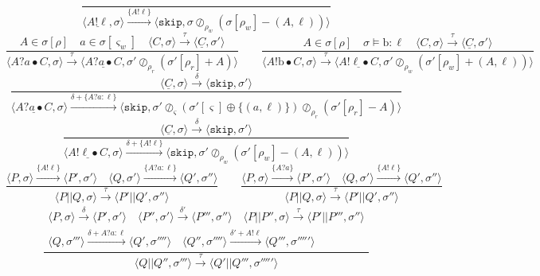 \documentclass[times,10pt]{article}
\begin{document}
$$    \frac{}{\langle \underline{A!\ell}, \sigma \rangle \xrightarrow{\{A!\ell\}} \langle \mathtt{skip}, \sigma \oslash_{\rho_w} (\sigma[\rho_w] - (A, \ell)) \rangle} $$$$
    \frac{A \in \sigma[\rho] \quad a \in \sigma[\varsigma_w] \quad \langle C, \sigma \rangle \xrightarrow{\tau} \langle \underline{C}, \sigma' \rangle}{\langle A?a \bullet C, \sigma \rangle \xrightarrow{\tau} \langle \underline{A?a \bullet C}, \sigma' \oslash_{\rho_r} (\sigma'[\rho_r] + A) \rangle} \qquad
    \frac{A \in \sigma[\rho] \quad \sigma \models \mathrm{b} : \ell \quad \langle C, \sigma \rangle \xrightarrow{\tau} \langle \underline{C}, \sigma' \rangle}{\langle A!\mathrm{b} \bullet C, \sigma \rangle \xrightarrow{\tau} \langle \underline{A!\ell \bullet C}, \sigma' \oslash_{\rho_w} (\sigma'[\rho_w] + (A, \ell)) \rangle} $$$$
    \frac{\langle \underline{C}, \sigma \rangle \xrightarrow{\delta} \langle \mathtt{skip}, \sigma' \rangle}{\langle \underline{A?a \bullet C}, \sigma \rangle \xrightarrow{\delta + \{A?a : \ell\}} \langle \mathtt{skip}, \sigma' \oslash_\varsigma (\sigma'[\varsigma] \oplus \{(a, \ell)\}) \oslash_{\rho_r} (\sigma'[\rho_r] - A) \rangle} $$$$
    \frac{\langle \underline{C}, \sigma \rangle \xrightarrow{\delta} \langle \mathtt{skip}, \sigma' \rangle}{\langle \underline{A!\ell \bullet C}, \sigma \rangle \xrightarrow{\delta + \{A!\ell\}} \langle \mathtt{skip}, \sigma' \oslash_{\rho_w} (\sigma'[\rho_w] - (A, \ell)) \rangle} $$$$
    \frac{\langle P, \sigma \rangle \xrightarrow{\{A!\ell\}} \langle P', \sigma' \rangle \quad \langle Q, \sigma' \rangle \xrightarrow{\{A?a : \ell\}} \langle Q', \sigma'' \rangle}{\langle P || Q, \sigma \rangle \xrightarrow{\tau} \langle P' || Q', \sigma'' \rangle} \qquad
    \frac{\langle P, \sigma \rangle \xrightarrow{\{A?a\}} \langle P', \sigma' \rangle \quad \langle Q, \sigma' \rangle \xrightarrow{\{A!\ell\}} \langle Q', \sigma'' \rangle}{\langle P || Q, \sigma \rangle \xrightarrow{\tau} \langle P' || Q', \sigma'' \rangle} $$$$
    \frac{\begin{matrix} \langle P, \sigma \rangle \xrightarrow{\delta} \langle P', \sigma' \rangle \quad \langle P'', \sigma' \rangle \xrightarrow{\delta'} \langle P''', \sigma'' \rangle \quad \langle P || P'', \sigma \rangle \xrightarrow{\tau} \langle P' || P''', \sigma'' \rangle \\ \langle Q, \sigma''' \rangle \xrightarrow{\delta + A?a : \ell} \langle Q', \sigma'''' \rangle \quad \langle Q'', \sigma'''' \rangle \xrightarrow{\delta' + A!\ell} \langle Q''', \sigma''''' \rangle \end{matrix}}{\langle Q || Q'', \sigma''' \rangle \xrightarrow{\tau} \langle Q' || Q''', \sigma''''' \rangle} $$$$
$$
\end{document}

